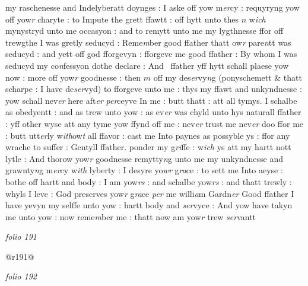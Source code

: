 \documentclass[12pt, a4paper]{book}
\begin{document}
      				
      				my raschenesse and Indelyberatt doynges : I aske off yow m\textit{er}cy : requyryng yow off yow\textit{r }charyte : to Impute the grett ffawtt : off hytt unto thes $n$ w\textit{ich} mynystryd unto me occasyon : and to remytt unto me my lygthnesse ffor off trewgthe I was gretly seducyd : Reme\textit{m}ber good ffather thatt ow\textit{r}  pare\textit{n}tt was seducyd : and yett off god fforgevyn : fforgeve me good ffather : By whom I was seducyd my co\textit{n}fessyon dothe declare : And  ffather yff hytt schall plaese yow now : more off yow\textit{r} goodnesse : then $m$ off my des\textit{er}vy\textit{n}g (ponyschemett \& thatt scharpe : I have de\textit{ser}vyd) to  fforgeve unto me : thys my ffawt and unkyndnesse : yow schall nev\textit{er} here aft\textit{er}
      				\textit{per}ceyve In me : butt thatt : att all tymys. I schalbe as obedyentt : and as trew unto yow : as ev\textit{er} was chyld unto hys naturall ffather : yff other wyse att any tyme yow ffynd off me : nev\textit{er} trust me nev\textit{er} doo ffor me : butt utt\textit{er}ly w\textit{ith}ow\textit{t }all ffavor : cast me Into paynes as possyble ys : ffor any wrache to suffer : Gentyll ffather. ponder my g\textit{ri}ffe : w\textit{ich} ys att my hartt nott lytle : And thorow yow\textit{r} goodnesse remytty\textit{n}g unto me my unkyndnesse and grawnty\textit{n}g m\textit{er}cy w\textit{ith} lyberty : I desyre yo\textit{wr} g\textit{ra}ce : to sett me Into aeyse : bothe off hartt and body : I am yow\textit{rs} : and schalbe yow\textit{rs} : and thatt trewly : whyls I leve : God preserves yow\textit{r} g\textit{ra}ce \textit{per }me willi\textit{a}m Gardn\textit{er}  Good ffather I have yevyn my selffe unto yow : hartt body and \textit{ser}vyce : And yow have takyn me unto yow : now reme\textit{m}ber me : thatt now am yow\textit{r} trew \textit{ser}vantt
      				
\dotfill
					

\textit{folio 191}
      		
      		
      		@r191@
      		
\dotfill
					

\textit{folio 192}
      		
      		
      		\vspace{4cm}
      		
\dotfill
					  \section*{}  \subsection*{}
\end{document}
